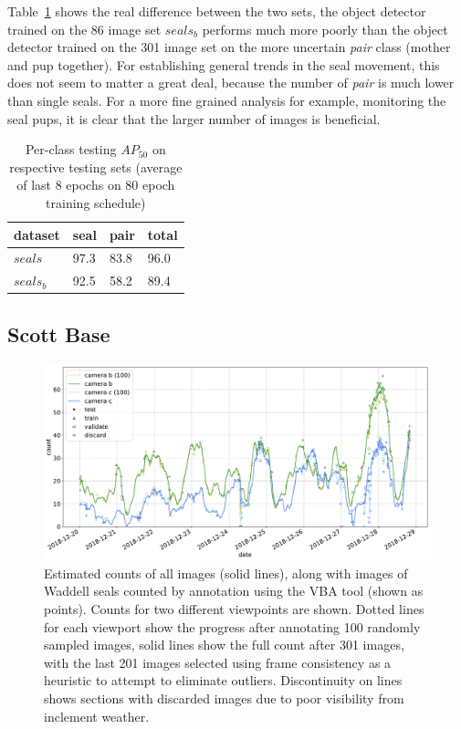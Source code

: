 Table~\ref{tab:seal_comparison} shows the real difference between the two sets, the object detector trained on the 86 image set $seals_b$ performs much more poorly than the object detector trained on the 301 image set on the more uncertain \emph{pair} class (mother and pup together). For establishing general trends in the seal movement, this does not seem to matter a great deal, because the number of \emph{pair} is much lower than single seals. For a more fine grained analysis for example, monitoring the seal pups, it is clear that the larger number of images is beneficial.

\begin{table}[tbh!]
    \centering
\caption{Per-class testing $AP_{50}$ on respective testing sets (average of last 8 epochs on 80 epoch training schedule) }    
\begin{tabular}{l|lll}
dataset & seal & pair & total \\
\toprule
$seals$       & 97.3      & 83.8      & 96.0      \\
$seals_b$     & 92.5      & 58.2      & 89.4       \\

\bottomrule
\end{tabular}
\label{tab:seal_comparison} 
\end{table}

 

\subsection{Scott Base \texorpdfstring{\cite{Eisert2019}}{}}

\begin{figure}[ht]
    \centering
    \includegraphics[width=1.0\linewidth]{charts/seals/scott_base_combined.pdf}
    \caption{Estimated counts  of all images (solid lines), along with images of Waddell seals counted by annotation using the \gls{VBA} tool (shown as points). Counts for two different viewpoints are shown. Dotted lines for each viewport show the progress after annotating 100 randomly sampled images, solid lines show the full count after 301 images, with the last 201 images selected using frame consistency as a heuristic to attempt to eliminate outliers. Discontinuity on lines shows sections with discarded images due to poor visibility from inclement weather. }
    \label{fig:scott_base}
\end{figure}

